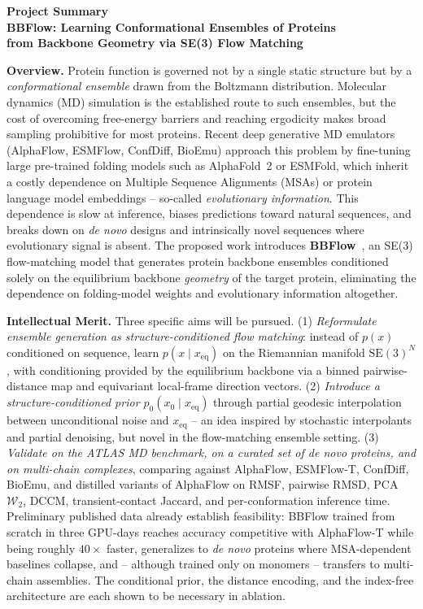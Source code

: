 \documentclass[12pt]{article}
\begin{document}
\begin{center}
  {\large\bfseries Project Summary}\\[4pt]
  \textbf{BBFlow: Learning Conformational Ensembles of Proteins\\
  from Backbone Geometry via SE(3) Flow Matching}
\end{center}

\noindent\textbf{Overview.}
Protein function is governed not by a single static structure but by a
\emph{conformational ensemble} drawn from the Boltzmann distribution. Molecular
dynamics (MD) simulation is the established route to such ensembles, but the
cost of overcoming free-energy barriers and reaching ergodicity makes broad
sampling prohibitive for most proteins. Recent deep generative MD emulators
(AlphaFlow, ESMFlow, ConfDiff, BioEmu) approach this problem by fine-tuning
large pre-trained folding models such as AlphaFold~2 or ESMFold, which
inherit a costly dependence on Multiple Sequence Alignments (MSAs) or protein
language model embeddings -- so-called \emph{evolutionary information}. This
dependence is slow at inference, biases predictions toward natural sequences,
and breaks down on \emph{de novo} designs and intrinsically novel sequences
where evolutionary signal is absent. The proposed work introduces
\textbf{BBFlow}~\cite{wolf2025bbflow}, an SE(3) flow-matching model that
generates protein backbone ensembles conditioned solely on the equilibrium
backbone \emph{geometry} of the target protein, eliminating the dependence on
folding-model weights and evolutionary information altogether.

\noindent\textbf{Intellectual Merit.}
Three specific aims will be pursued. (1) \emph{Reformulate ensemble generation
as structure-conditioned flow matching}: instead of $p(x)$ conditioned on
sequence, learn $p(x \mid x_{\mathrm{eq}})$ on the Riemannian manifold
$\mathrm{SE}(3)^N$, with conditioning provided by the equilibrium backbone via
a binned pairwise-distance map and equivariant local-frame direction vectors.
(2) \emph{Introduce a structure-conditioned prior $p_0(x_0 \mid x_{\mathrm{eq}})$}
through partial geodesic interpolation between unconditional noise and
$x_{\mathrm{eq}}$ -- an idea inspired by stochastic interpolants and partial
denoising, but novel in the flow-matching ensemble setting. (3) \emph{Validate
on the ATLAS MD benchmark, on a curated set of \emph{de novo} proteins, and on
multi-chain complexes}, comparing against AlphaFlow, ESMFlow-T, ConfDiff,
BioEmu, and distilled variants of AlphaFlow on RMSF, pairwise RMSD, PCA
$\mathcal{W}_2$, DCCM, transient-contact Jaccard, and per-conformation inference
time. Preliminary published data already establish feasibility: BBFlow trained
from scratch in three GPU-days reaches accuracy competitive with AlphaFlow-T
while being roughly $40\times$ faster, generalizes to \emph{de novo} proteins
where MSA-dependent baselines collapse, and -- although trained only on
monomers -- transfers to multi-chain assemblies. The conditional prior, the
distance encoding, and the index-free architecture are each shown to be
necessary in ablation.
\end{document}
